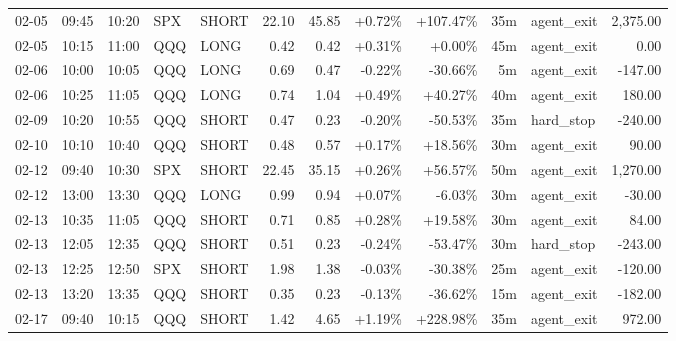 \documentclass[11pt,a4paper,twoside]{article}
\begin{document}
\begin{center}
\begin{longtable}{>{\color{txtmain}}l l l l l r r r r r >{\color{txtmain}}l r}
02-05 & 09:45 & 10:20 & SPX & SHORT & 22.10 & 45.85 & \textcolor{wingreen}{+0.72\%} & \textcolor{wingreen}{+107.47\%} & 35m & agent\_exit & \textcolor{wingreen}{2,375.00} \\
02-05 & 10:15 & 11:00 & QQQ & LONG & 0.42 & 0.42 & \textcolor{wingreen}{+0.31\%} & \textcolor{wingreen}{+0.00\%} & 45m & agent\_exit & \textcolor{wingreen}{0.00} \\
02-06 & 10:00 & 10:05 & QQQ & LONG & 0.69 & 0.47 & \textcolor{lossred}{-0.22\%} & \textcolor{lossred}{-30.66\%} & 5m & agent\_exit & \textcolor{lossred}{-147.00} \\
02-06 & 10:25 & 11:05 & QQQ & LONG & 0.74 & 1.04 & \textcolor{wingreen}{+0.49\%} & \textcolor{wingreen}{+40.27\%} & 40m & agent\_exit & \textcolor{wingreen}{180.00} \\
02-09 & 10:20 & 10:55 & QQQ & SHORT & 0.47 & 0.23 & \textcolor{lossred}{-0.20\%} & \textcolor{lossred}{-50.53\%} & 35m & hard\_stop & \textcolor{lossred}{-240.00} \\
02-10 & 10:10 & 10:40 & QQQ & SHORT & 0.48 & 0.57 & \textcolor{wingreen}{+0.17\%} & \textcolor{wingreen}{+18.56\%} & 30m & agent\_exit & \textcolor{wingreen}{90.00} \\
02-12 & 09:40 & 10:30 & SPX & SHORT & 22.45 & 35.15 & \textcolor{wingreen}{+0.26\%} & \textcolor{wingreen}{+56.57\%} & 50m & agent\_exit & \textcolor{wingreen}{1,270.00} \\
02-12 & 13:00 & 13:30 & QQQ & LONG & 0.99 & 0.94 & \textcolor{wingreen}{+0.07\%} & \textcolor{lossred}{-6.03\%} & 30m & agent\_exit & \textcolor{lossred}{-30.00} \\
02-13 & 10:35 & 11:05 & QQQ & SHORT & 0.71 & 0.85 & \textcolor{wingreen}{+0.28\%} & \textcolor{wingreen}{+19.58\%} & 30m & agent\_exit & \textcolor{wingreen}{84.00} \\
02-13 & 12:05 & 12:35 & QQQ & SHORT & 0.51 & 0.23 & \textcolor{lossred}{-0.24\%} & \textcolor{lossred}{-53.47\%} & 30m & hard\_stop & \textcolor{lossred}{-243.00} \\
02-13 & 12:25 & 12:50 & SPX & SHORT & 1.98 & 1.38 & \textcolor{lossred}{-0.03\%} & \textcolor{lossred}{-30.38\%} & 25m & agent\_exit & \textcolor{lossred}{-120.00} \\
02-13 & 13:20 & 13:35 & QQQ & SHORT & 0.35 & 0.23 & \textcolor{lossred}{-0.13\%} & \textcolor{lossred}{-36.62\%} & 15m & agent\_exit & \textcolor{lossred}{-182.00} \\
02-17 & 09:40 & 10:15 & QQQ & SHORT & 1.42 & 4.65 & \textcolor{wingreen}{+1.19\%} & \textcolor{wingreen}{+228.98\%} & 35m & agent\_exit & \textcolor{wingreen}{972.00} \\

\end{longtable}
\end{center}
\end{document}
